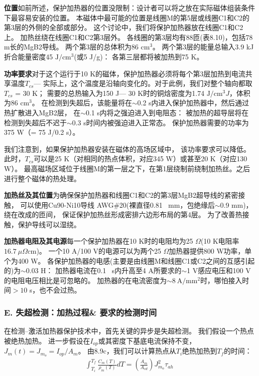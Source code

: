 \textbf{位置}\qquad 如前所述，保护加热器的位置没限制：设计者可以将之放在实际磁体组装条件下最容易安装的位置。
本磁体中最可能的位置是线圈M的第5层或线圈C1和C2的第3层的外侧的全部或部分。
这个讨论中，我们将保护加热器放在线圈C1和C2上。
加热丝绕在线圈C1和C2第3层外。
各线圈的第3层均有88匝(表8.10)，包括78 m长的MgB2导线。
两个第3层的总体积为86 $\mathrm{cm^3}$。
两个第3层的能量总输入3.9 kJ折合能量密度45 $\mathrm{J/cm^3}$(或5 J/g)：
各第三层都将被加热到75 K。

\textbf{功率要求}\qquad 对于这个运行于10 K的磁体，保护加热器必须将每个第3层加热到电流共享温度$T_{cs}$---
实际上，这个温度是沿轴向变化的。对于此例，我们对整个轴向都取$T_{cs}$ = 30 K；
需要的总热输入为150 J---
 30 K时的铜焓密度为1.74 $\mathrm{J /cm^3}J$，体积为86 $\mathrm{cm^3}$。
 在检测到失超后，该能量将在$\sim$0.2 s内进入保护加热器中，然后通过热扩散进入MgB2层，
 在$\sim$0.1 s内将之强迫进入到电阻态：
 被加热的超导层将在检测到失超后不迟于$\sim$0.3 s时间内被强迫进入正常态。
 保护加热器需要的功率为375 W（= 75 J/0.2 s）。

我们注意到，如果保护加热器安装在磁体的高场区域中，
该功率要求可以降低。
此时，$T_{cs}$可以是25 K（对相同的热点体积，对应345 W）或甚至20 K（对应130 W）。
最高磁场区域位于线圈M的第一层之下，在第1层绕制前绕制加热丝。之后进行整个磁体的热处理。

\textbf{加热丝及其位置}\qquad 为确保保护加热器和线圈C1和C2的第3层MgB2超导线的紧密接触，
可以使用Cu90-Ni10导线 AWG\#20(裸直径0.81~ mm，包绝缘后$\sim$0.9 mm)，绕在改成的匝间，
保证保护加热丝形成密排六边形布局的第4层。
为了改善热接触，保护导线可以湿绕。

\textbf{加热器电阻及其电源}\qquad 每一个保护加热器在10 K时的电阻均为25 $\Omega$(10 K电阻率$16.7\ \mu\Omega$cm)。
一个10 A/100 V的电源可以为两个25 $\Omega$加热器提供800 W功率，单个为400 W。
各保护加热器的电感(主要是由线圈M和线圈C1或C2之间的互感引起的)为$\sim 0.03$ H：
加热器电流在0.1~ s内升高至4 A所要求的$\sim$1 V感应电压和100 V的电阻电压相比是可忽略的。
加热器的在电流密度为$\sim 8\ \mathrm{A/mm^2}$时，哪怕接入时间$>10$ s，也不会过热。

\subsubsection*{E. 失超检测：加热过程\& 要求的检测时间}
在检测--激活加热器保护技术中，首先关键的异步是失超检测。
我们假设一个热点被绝热加热。
进一步假设在$I_{op}$或其密度下基底电流保持不变，$J_m(t)=J_{m_o}=I_{op}/A_m$。
由8.9c，我们可以计算热点从$T_i$绝热加热到$T_f$的时间：
\begin{align*}%
\int_{T_i}^{T_f}\frac{C_m(T)}{\rho_m(T)}dT=\left(\frac{A_m}{A_{cd}}\right)J_{m_o}^{2}\tau_{ah} \tag{8.9c}
\end{align*}

